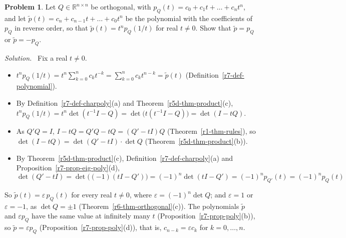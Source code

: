 \documentclass[12pt]{article}
\newcommand{\R}{\mathbb R}
\theoremstyle{definition}
\newtheorem{problem}{Problem}
\newenvironment{solution}{\par\noindent\textit{Solution.}\ }{\par\smallskip}
\begin{document}
\begin{problem}\label{r7-ex-pr-orthogonal-charpoly}
Let \(Q\in\R^{n\times n}\) be orthogonal, with \(p_Q(t)=c_0+c_1t+\dots+c_nt^n\), and let
\(\tilde p(t)=c_n+c_{n-1}t+\dots+c_0t^n\) be the polynomial with the coefficients of \(p_Q\) in reverse order, so that
\(\tilde p(t)=t^np_Q(1/t)\) for real \(t\ne0\). Show that \(\tilde p=p_Q\) or \(\tilde p=-p_Q\).
\end{problem}
\begin{solution}
Fix a real \(t\ne0\).
\begin{itemize}
\item \(t^np_Q(1/t)=t^n\sum_{k=0}^nc_kt^{-k}=\sum_{k=0}^nc_kt^{n-k}=\tilde p(t)\) (Definition~\ref{r7-def-polynomial}).
\item By Definition~\ref{r7-def-charpoly}(a) and Theorem~\ref{r5d-thm-product}(c),
\(t^np_Q(1/t)=t^n\det(t^{-1}I-Q)=\det\bigl(t(t^{-1}I-Q)\bigr)=\det(I-tQ)\).
\item As \(Q'Q=I\), \(I-tQ=Q'Q-tQ=(Q'-tI)Q\) (Theorem~\ref{r1-thm-rules}), so \(\det(I-tQ)=\det(Q'-tI)\cdot\det Q\)
(Theorem~\ref{r5d-thm-product}(b)).
\item By Theorem~\ref{r5d-thm-product}(c), Definition~\ref{r7-def-charpoly}(a) and
Proposition~\ref{r7-prop-eig-poly}(d),
\[
\det(Q'-tI)=\det\bigl((-1)(tI-Q')\bigr)=(-1)^n\det(tI-Q')=(-1)^np_{Q'}(t)=(-1)^np_Q(t)
\]
\end{itemize}
So \(\tilde p(t)=\varepsilon\,p_Q(t)\) for every real \(t\ne0\), where \(\varepsilon=(-1)^n\det Q\); and
\(\varepsilon=1\) or \(\varepsilon=-1\), as \(\det Q=\pm1\) (Theorem~\ref{r6-thm-orthogonal}(c)). The polynomials
\(\tilde p\) and \(\varepsilon p_Q\) have the same value at infinitely many \(t\) (Proposition~\ref{r7-prop-poly}(b)), so
\(\tilde p=\varepsilon p_Q\) (Proposition~\ref{r7-prop-poly}(d)), that is, \(c_{n-k}=\varepsilon c_k\) for
\(k=0,\dots,n\).
\end{solution}
\end{document}
